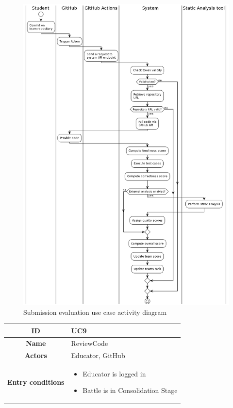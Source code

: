 \begin{center}
\begin{figure}[H]
        \includegraphics[scale=0.4]{Diagrams/activity_evaluatesubmission.png}
        \caption{Submission evaluation use case activity diagram}
    \end{figure}
    \begin{tabular}{ |c|m{10cm}| }
        \hline
        \textbf{ID} & UC9 \\
        \hline
        \textbf{Name} & ReviewCode \\
        \hline
        \textbf{Actors} & Educator, GitHub \\
        \hline
        \textbf{Entry conditions} &
        \begin{itemize}
            \item Educator is logged in
            \item Battle is in Consolidation Stage
        \end{itemize} \\

\end{tabular}
\end{center}
